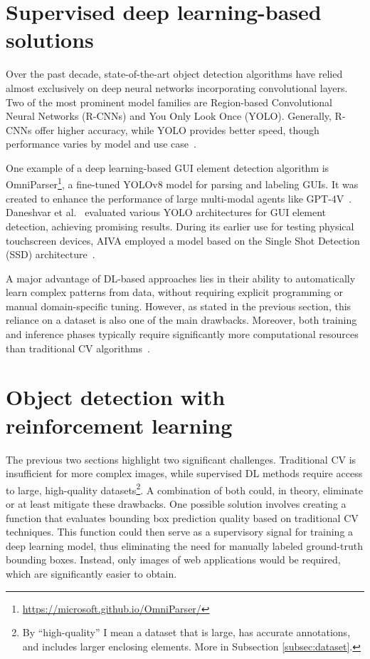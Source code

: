 \documentclass[
  digital,     %
  oneside,     %
  nosansbold,  %
  nocolorbold, %
  lof,         %
  lot,         %
]{fithesis4}
\begin{document}
\section{Supervised deep learning-based solutions}
Over the past decade, state-of-the-art object detection algorithms have relied almost exclusively on deep neural networks incorporating convolutional layers. Two of the most prominent model families are Region-based Convolutional Neural Networks (R-CNNs) and You Only Look Once (YOLO). Generally, R-CNNs offer higher accuracy, while YOLO provides better speed, though performance varies by model and use case~\cite{ObjectDetectionHistorySurvey}.

One example of a deep learning-based GUI element detection algorithm is OmniParser\footnote{\url{https://microsoft.github.io/OmniParser/}}, a fine-tuned YOLOv8 model for parsing and labeling GUIs. It was created to enhance the performance of large multi-modal agents like GPT-4V~\cite{OmniParser}. Daneshvar et al.~\cite{GUI_YOLO_comparison} evaluated various YOLO architectures for GUI element detection, achieving promising results. During its earlier use for testing physical touchscreen devices, AIVA employed a model based on the Single Shot Detection (SSD) architecture~\cite{Horak2020thesis}.

A major advantage of DL-based approaches lies in their ability to automatically learn complex patterns from data, without requiring explicit programming or manual domain-specific tuning. However, as stated in the previous section, this reliance on a dataset is also one of the main drawbacks. Moreover, both training and inference phases typically require significantly more computational resources than traditional CV algorithms~\cite{DLvsTCV}.

\section{Object detection with reinforcement learning}

The previous two sections highlight two significant challenges. Traditional CV is insufficient for more complex images, while supervised DL methods require access to large, high-quality datasets\footnote{By \enquote{high-quality} I mean a dataset that is large, has accurate annotations, and includes larger enclosing elements. More in Subsection \ref{subsec:dataset}.}. A combination of both could, in theory, eliminate or at least mitigate these drawbacks. One possible solution involves creating a function that evaluates bounding box prediction quality based on traditional CV techniques. This function could then serve as a supervisory signal for training a deep learning model, thus eliminating the need for manually labeled ground-truth bounding boxes. Instead, only images of web applications would be required, which are significantly easier to obtain.
\end{document}

